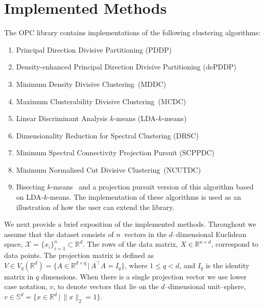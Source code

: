 \documentclass{book}
\def\R{\mathbb{R}}
\begin{document}
\chapter{Implemented Methods}

The OPC library contains implementations of the following clustering
algorithms:

\begin{enumerate}

\item Principal Direction Divisive Partitioning (PDDP)~\cite{Boley1998}

\item Density-enhanced Principal Direction Divisive Partitioning (dePDDP)~\cite{TasoulisTP2010}

\item Minimum Density Divisive Clustering~(MDDC)~\cite{PavlidisHT2016}

\item Maximum Clusterability Divisive Clustering~(MCDC)~\cite{HofmeyrP2015}

\item Linear Discriminant Analysis $k$-means (LDA-$k$-means)~\cite{DingL2007}

\item Dimensionality Reduction for Spectral Clustering (DRSC)~\cite{NiuDJ2011,NiuDJ2014}

\item Minimum Spectral Connectivity Projection Pursuit (SCPPDC)~\cite{HofmeyrPE2018}

\item Minimum Normalised Cut Divisive Clustering~(NCUTDC)~\cite{Hofmeyr2017}

\item Bisecting $k$-means~\cite{SteinbachKK2000} and a projection pursuit
version of this algorithm based on LDA-$k$-means.
The implementation of these
algorithms is used as an illustration of how the user can extend the library.

\end{enumerate}


\noindent
%
We next provide a brief exposition of the implemented methods.
Throughout we assume that the
dataset consists of $n$~vectors in the $d$--dimensional Euclidean space,
$\mathcal{X} = \{x_i\}_{i=1}^n \subset \R^d$.
%
The rows of the data matrix,
$X \in \R^{n \times d}$, correspond to data points. 
%
The projection matrix is defined as
%
$V \in V_q(\R^d) = \{A \in \R^{d \times q} \,|\, A^\top A = I_q\}$, where 
$1\leqslant q<d$, and $I_q$ is the identity matrix in $q$ dimensions.
%
When there is a single projection vector we use lower case notation, $v$,
to denote vectors that lie on the $d$--dimensional unit--sphere,
$v \in \mathbb{S}^{d} = \{ x \in \R^d \,|\, \|x\|_2=1\}$.
\end{document}

